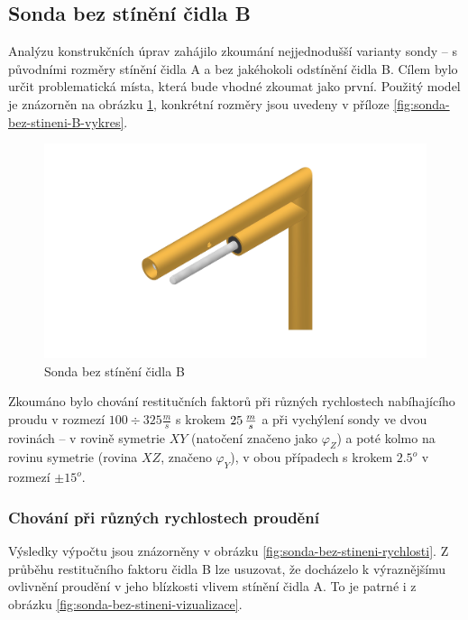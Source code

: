     \subsection{Sonda bez stínění čidla B} \label{sec:sonda-bez-stineni-B}
        Analýzu konstrukčních úprav zahájilo zkoumání nejjednodušší varianty sondy – s původními rozměry stínění čidla A a bez jakéhokoli odstínění čidla B. Cílem bylo určit problematická místa, která bude vhodné zkoumat jako první. Použitý model je znázorněn na obrázku \ref{fig:sonda-bez-stineni-B}, konkrétní rozměry jsou uvedeny v příloze \ref{fig:sonda-bez-stineni-B-vykres}. 

        \begin{figure}[ht!]
            \centering
            \includegraphics[width=\textwidth]{400_SIMULACE_KONSTRUKCNICH_UPRAV/Vykresy_rendery/Sonda_bez_stineni_B.png}
            \caption{Sonda bez stínění čidla B}
            \label{fig:sonda-bez-stineni-B}
        \end{figure}
        
        Zkoumáno bylo chování restitučních faktorů při různých rychlostech nabíhajícího proudu v rozmezí $100 \div 325 \unit{\frac{m}{s}}$ s krokem $25 \, \frac{m}{s}$ a při vychýlení sondy ve dvou rovinách – v rovině symetrie $XY$ (natočení značeno jako $\varphi _Z$) a poté kolmo na rovinu symetrie (rovina $XZ$, značeno $\varphi _Y$), v obou případech s krokem $2.5^o$ v rozmezí $\pm 15^o$.
                
        \subsubsection{Chování při různých rychlostech proudění}
            Výsledky výpočtu jsou znázorněny v obrázku \ref{fig:sonda-bez-stineni-rychlosti}. Z průběhu restitučního faktoru čidla B lze usuzovat, že docházelo k výraznějšímu ovlivnění proudění v jeho blízkosti vlivem stínění čidla A. To je patrné i z obrázku \ref{fig:sonda-bez-stineni-vizualizace}. 
            
